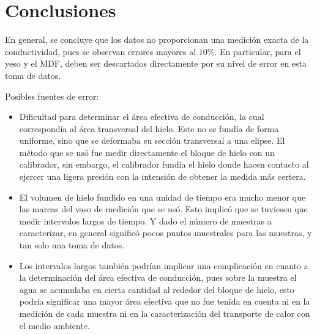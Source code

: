 \section{Conclusiones}

En general, se concluye que los datos no proporcionan una medición exacta de la conductividad, pues se observan errores mayores al $10\%$. En particular, para el yeso y el MDF, deben ser descartados directamente por su nivel de error en esta toma de datos. 

Posibles fuentes de error:

\begin{itemize}
    \item Dificultad para determinar el área efectiva de conducción, la cual correspondía al área transversal del hielo. Este no se fundía de forma uniforme, sino que se deformaba su sección transversal a una elipse. El método que se usó fue medir directamente el bloque de hielo con un calibrador, sin embargo, el calibrador fundía el hielo donde hacen contacto al ejercer una ligera presión con la intensión de obtener la medida más certera.
    \item  El volumen de hielo fundido en una unidad de tiempo era mucho menor que las marcas del vaso de medición que se usó. Esto implicó que se tuviesen que medir intervalos largos de tiempo. Y dado el número de muestras a caracterizar, en general significó pocos puntos muestrales para las muestras, y tan solo una toma de datos. 
    \item Los intervalos largos también podrían implicar una complicación en cuanto a la determinación del área efectiva de conducción, pues sobre la muestra el agua se acumulaba en cierta cantidad al rededor del bloque de hielo, esto podría significar una mayor área efectiva que no fue tenida en cuenta ni en la medición de cada muestra ni en la caracterización del transporte de calor con el medio ambiente.
\end{itemize}